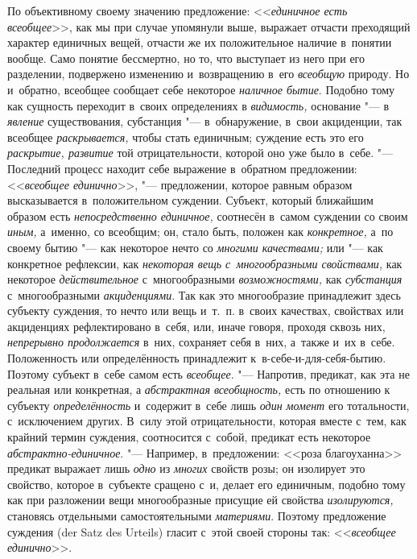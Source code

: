 По объективному своему значению предложение: <<{\em единичное есть всеобщее}>>,
как мы при случае упомянули выше, выражает отчасти преходящий характер
единичных вещей, отчасти же их положительное наличие в~понятии вообще. Само
понятие бессмертно, но то, что выступает из него при его разделении, подвержено
изменению и~возвращению в~его {\em всеобщую} природу. Но и~обратно, всеобщее
сообщает себе некоторое {\em наличное бытие}. Подобно тому как сущность
переходит в~своих определениях в {\em видимость,} основание "---
в {\em явление} существования, субстанция "--- в~обнаружение, в~свои
акциденции, так всеобщее {\em раскрывается,} чтобы стать единичным; суждение
есть это его {\em раскрытие, развитие} той отрицательности, которой оно
уже было в~себе. "--- Последний процесс находит себе выражение в~обратном
предложении: <<{\em всеобщее единично}>>, "--- предложении, которое равным
образом высказывается в~положительном суждении. Субъект, который ближайшим
образом есть {\em непосредственно единичное,} соотнесён в~самом суждении со
своим {\em иным,} а~именно, со всеобщим; он, стало быть, положен как
{\em конкретное,} а~по своему бытию "--- как некоторое нечто со
{\em многими качествами;} или "--- как конкретное рефлексии, как {\em некоторая
вещь с~многообразными свойствами,} как некоторое {\em действительное}
с~многообразными {\em возможностями,} как {\em субстанция} с~многообразными
{\em акциденциями}. Так как это многообразие принадлежит здесь субъекту
суждения, то нечто или вещь и~т.~п. в~своих качествах, свойствах или
акциденциях рефлектировано в~себя, или, иначе говоря, проходя сквозь них,
{\em непрерывно продолжается} в~них, сохраняет себя в~них, а~также и~их в~себе.
Положенность или определённость принадлежит к~в-себе-и-для-себя-бытию. Поэтому
субъект в~себе самом есть {\em всеобщее}. "--- Напротив, предикат, как эта не
реальная или конкретная, а {\em абстрактная всеобщность,} есть по отношению к
субъекту {\em определённость} и~содержит в~себе лишь {\em один момент} его
тотальности, с~исключением других. В~силу этой отрицательности, которая вместе
с~тем, как крайний термин суждения, соотносится с~собой, предикат есть
некоторое {\em абстрактно-единичное}. "--- Например, в~предложении: <<роза
благоуханна>> предикат выражает лишь {\em одно} из {\em многих} свойств розы;
он изолирует это свойство, которое в~субъекте сращено с~и, делает его
единичным, подобно тому как при разложении вещи многообразные присущие ей
свойства {\em изолируются,} становясь отдельными самостоятельными
{\em материями}. Поэтому предложение суждения (der Satz des
Urteils) гласит с~этой своей стороны так: <<{\em всеобщее единично}>>.

